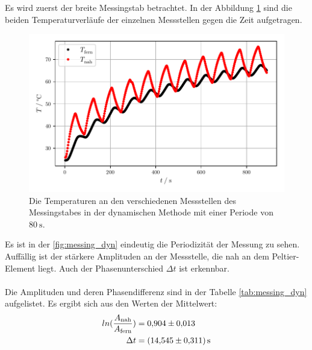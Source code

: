 Es wird zuerst der breite Messingstab betrachtet. 
In der Abbildung \ref{fig:messing_dyn} sind die beiden Temperaturverläufe der einzelnen Messstellen gegen die Zeit aufgetragen.
\begin{figure}[H]
  \centering
  \includegraphics{build/plot_messing.pdf}
  \caption{Die Temperaturen an den verschiedenen Messstellen des Messingstabes in der dynamischen Methode mit einer Periode von $\SI{80}{\second}$.}
  \label{fig:messing_dyn}
\end{figure}
Es ist in der \autoref{fig:messing_dyn} eindeutig die Periodizität der Messung zu sehen.
Auffällig ist der stärkere Amplituden an der Messstelle, die nah an dem Peltier-Element liegt.
Auch der Phasenunterschied $\Delta t$ ist erkennbar.\\
\\
Die Amplituden und deren Phasendifferenz sind in der Tabelle \ref{tab:messing_dyn} aufgelistet.
Es ergibt sich aus den Werten der Mittelwert:
\begin{align*}
  ln(\frac{A_{\text{nah}}}{A_{\text{fern}}}) &= \num{0.904 \pm 0.013}\\
  \Delta t &= \SI{14.545 \pm 0.311}{\second}
\end{align*} 

